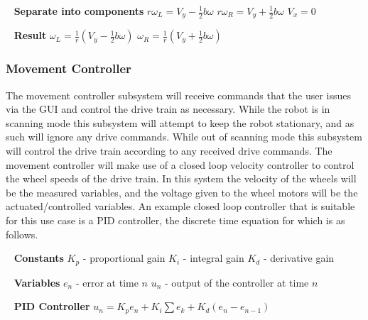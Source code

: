 \documentclass[12pt]{article}
\begin{document}
\ \newline
\textbf{Separate into components}
\newline $r\omega_L = V_y - \frac{1}{2}b\omega$
\newline $r\omega_R = V_y + \frac{1}{2}b\omega$
\newline $V_x = 0$

\ \newline
\textbf{Result}
\newline $\omega_L = \frac{1}{r} (V_y - \frac{1}{2}b\omega)$
\newline $\omega_R = \frac{1}{r} (V_y + \frac{1}{2}b\omega)$

\subsubsection{Movement Controller}
The movement controller subsystem will receive commands that the user issues via the GUI and control the
drive train as necessary.
\newline\newline
While the robot is in scanning mode this subsystem will attempt to keep the robot stationary, and as such
will ignore any drive commands. While out of scanning mode this subsystem will control the drive train
according to any received drive commands.
\newline\newline
The movement controller will make use of a closed loop velocity controller to control the wheel speeds of
the drive train. In this system the velocity of the wheels will be the measured variables, and the voltage
given to the wheel motors will be the actuated/controlled variables. An example closed loop controller that
is suitable for this use case is a PID controller, the discrete time equation for which is as follows.

\ \newline
\textbf{Constants}
\newline $K_p$ - proportional gain
\newline $K_i$ - integral gain
\newline $K_d$ - derivative gain

\ \newline
\textbf{Variables}
\newline $e_n$ - error at time $n$
\newline $u_n$ - output of the controller at time $n$

\ \newline
\textbf{PID Controller}
\newline $u_n = K_p e_n + K_i \sum e_k + K_d (e_n - e_{n-1})$
\end{document}
